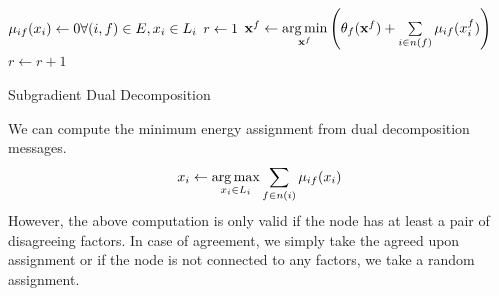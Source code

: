 \documentclass[letterpaper, 10 pt, conference]{ieeeconf} %
\DeclareMathOperator*{\argmin}{arg\,min}
\DeclareMathOperator*{\argmax}{arg\,max}
\begin{document}
\begin{algorithm}
  \dontprintsemicolon

  $\msg{i}{f}{x_i} \assign 0 \hfill \forall (i, f) \in E, x_i \in \Sx$\;
  $r \leftarrow 1$\;
   {
     {%
      $\map^f \assign \argmin\limits_{\map^f} \left( \theta_f(\map^f) + \sum\limits_{i \in n(f)}\msg{i}{f}{x^f_i} \right)$\;
    }
     {
    }
    $r \leftarrow r + 1$\;
  }
  \label{alg:dualdecompostion}
  \caption{Subgradient Dual Decomposition}
\end{algorithm}
We can compute the minimum energy assignment from dual decomposition messages.
\begin{align}
  x_i \assign \argmax\limits_{x_i \in \Sx} \sum\limits_{f \in n(i)} \msg{i}{f}{x_i}
\end{align}
However, the above computation is only valid if the node has at least a pair of disagreeing factors. In case of agreement, we simply take the agreed upon assignment or if the node is not connected to any factors, we take a random assignment.
\end{document}
